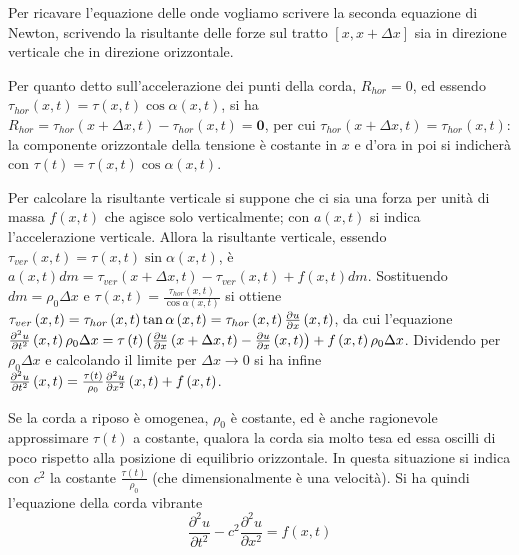 \documentclass{article}
\begin{document}
Per ricavare l'equazione delle onde vogliamo scrivere la seconda equazione
di Newton, scrivendo la risultante delle forze sul tratto $\left[ x,x+\Delta
x\right] $ sia in direzione verticale che in direzione orizzontale.

Per quanto detto sull'accelerazione dei punti della corda, $R_{hor}\mathbf{=}%
0$, ed essendo $\tau _{hor}\left( x,t\right) =\tau \left( x,t\right) \cos
\alpha \left( x,t\right) $, si ha $R_{hor}=\tau _{hor}\left( x+\Delta
x,t\right) -\tau _{hor}\left( x,t\right) =\mathbf{0}$, per cui $\tau
_{hor}\left( x+\Delta x,t\right) =\tau _{hor}\left( x,t\right) $: la
componente orizzontale della tensione \`{e} costante in $x$ e d'ora in poi
si indicher\`{a} con $\tau \left( t\right) =\tau \left( x,t\right) \cos
\alpha \left( x,t\right) $.

Per calcolare la risultante verticale si suppone che ci sia una forza per
unit\`{a} di massa $f\left( x,t\right) $ che agisce solo verticalmente; con $%
a\left( x,t\right) $ si indica l'accelerazione verticale. Allora la
risultante verticale, essendo $\tau _{ver}\left( x,t\right) =\tau \left(
x,t\right) \sin \alpha \left( x,t\right) $, \`{e} $a\left( x,t\right)
dm=\tau _{ver}\left( x+\Delta x,t\right) -\tau _{ver}\left( x,t\right)
+f\left( x,t\right) dm$. Sostituendo $dm=\rho _{0}\Delta x$ e $\tau \left(
x,t\right) =\frac{\tau _{hor}\left( x,t\right) }{\cos \alpha \left(
x,t\right) }$ si ottiene $\tau _{ver}\left( x,t\right) =\tau _{hor}\left(
x,t\right) \tan \alpha \left( x,t\right) =\tau _{hor}\left( x,t\right) \frac{%
\partial u}{\partial x}\left( x,t\right) $, da cui l'equazione $\frac{%
\partial ^{2}u}{\partial t^{2}}\left( x,t\right) \rho _{0}\Delta x=\tau
\left( t\right) \left( \frac{\partial u}{\partial x}\left( x+\Delta
x,t\right) -\frac{\partial u}{\partial x}\left( x,t\right) \right) +f\left(
x,t\right) \rho _{0}\Delta x$. Dividendo per $\rho _{0}\Delta x$ e
calcolando il limite per $\Delta x\rightarrow 0$ si ha infine $\frac{%
\partial ^{2}u}{\partial t^{2}}\left( x,t\right) =\frac{\tau \left( t\right) 
}{\rho _{0}}\frac{\partial ^{2}u}{\partial x^{2}}\left( x,t\right) +f\left(
x,t\right) $.

Se la corda a riposo \`{e} omogenea, $\rho _{0}$ \`{e} costante, ed \`{e}
anche ragionevole approssimare $\tau \left( t\right) $ a costante, qualora
la corda sia molto tesa ed essa oscilli di poco rispetto alla posizione di
equilibrio orizzontale. In questa situazione si indica con $c^{2}$ la
costante $\frac{\tau \left( t\right) }{\rho _{0}}$ (che dimensionalmente 
\`{e} una velocit\`{a}). Si ha quindi l'equazione della corda vibrante%
\begin{equation*}
\frac{\partial ^{2}u}{\partial t^{2}}-c^{2}\frac{\partial ^{2}u}{\partial
x^{2}}=f\left( x,t\right)
\end{equation*}
\end{document}

